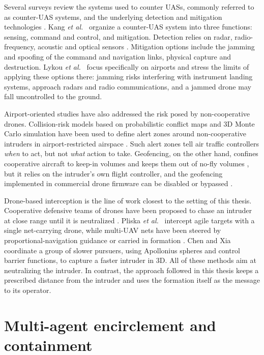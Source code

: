 Several surveys review the systems used to counter \glspl{UAS}, commonly referred to as counter-\gls{UAS} systems, and the underlying detection and mitigation technologies \cite{wang2021cuas,kang2020,lykou2020,chiper2022}. Kang \emph{et al.}~\cite{kang2020} organize a counter-\gls{UAS} system into three functions: sensing, command and control, and mitigation. Detection relies on radar, radio-frequency, acoustic and optical sensors \cite{wang2021cuas,chiper2022}. Mitigation options include the jamming and spoofing of the command and navigation links, physical capture and destruction. Lykou \emph{et al.}~\cite{lykou2020} focus specifically on airports and stress the limits of applying these options there: jamming risks interfering with instrument landing systems, approach radars and radio communications, and a jammed drone may fall uncontrolled to the ground.

Airport-oriented studies have also addressed the risk posed by non-cooperative drones. Collision-risk models based on probabilistic conflict maps and \gls{3D} Monte Carlo simulation have been used to define alert zones around non-cooperative intruders in airport-restricted airspace \cite{wang2019alert,wang2020mc}. Such alert zones tell air traffic controllers \emph{when} to act, but not \emph{what} action to take. Geofencing, on the other hand, confines cooperative aircraft to keep-in volumes and keeps them out of no-fly volumes \cite{kim2022geofence}, but it relies on the intruder's own flight controller, and the geofencing implemented in commercial drone firmware can be disabled or bypassed \cite{schiller2023}.

Drone-based interception is the line of work closest to the setting of this thesis. Cooperative defensive teams of drones have been proposed to chase an intruder at close range until it is neutralized \cite{castrillo2022}. Pliska \emph{et al.}~\cite{pliska2024} intercept agile targets with a single net-carrying drone, while multi-\gls{UAV} nets have been steered by proportional-navigation guidance \cite{wang2025net} or carried in formation \cite{rothe2025}. Chen and Xia~\cite{chen2025capture} coordinate a group of slower pursuers, using Apollonius spheres and control barrier functions, to capture a faster intruder in \gls{3D}. All of these methods aim at neutralizing the intruder. In contrast, the approach followed in this thesis keeps a prescribed distance from the intruder and uses the formation itself as the message to its operator.

\section{Multi-agent encirclement and containment}

